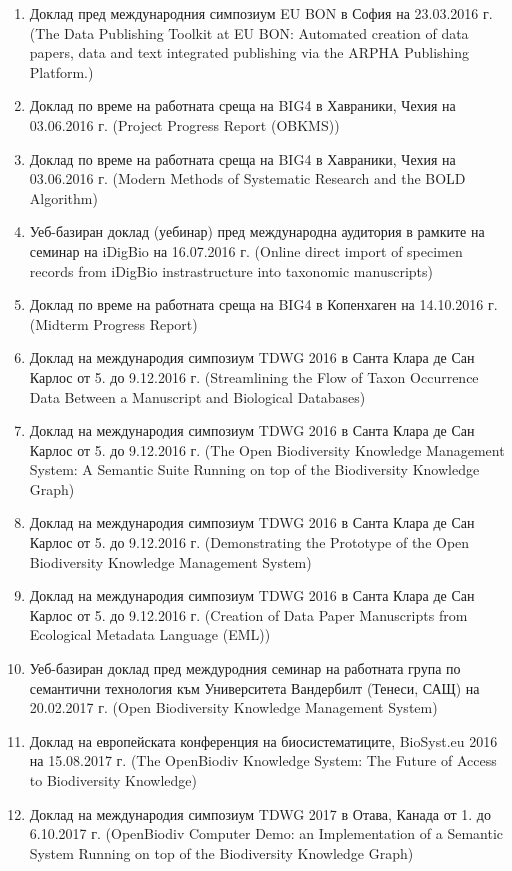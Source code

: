\begin{enumerate}
    \item Доклад пред международния симпозиум EU BON в София на 23.03.2016 г. (The Data Publishing Toolkit at EU BON: Automated creation of data papers, data and text integrated publishing via the ARPHA Publishing Platform.)
    \item Доклад по време на работната среща на BIG4 в Хавраники, Чехия на 03.06.2016 г. (Project Progress Report (OBKMS))
    \item Доклад по време на работната среща на BIG4 в Хавраники, Чехия на 03.06.2016 г. (Modern Methods of Systematic Research and the BOLD Algorithm)
    \item Уеб-базиран доклад (уебинар) пред международна аудитория в рамките на семинар на iDigBio на 16.07.2016 г. (Online direct import of specimen records from iDigBio instrastructure into taxonomic manuscripts)
    \item Доклад по време на работната среща на BIG4 в Копенхаген на 14.10.2016 г. (Midterm Progress Report)
    \item Доклад на международия симпозиум TDWG 2016 в Санта Клара де Сан Карлос от 5. до 9.12.2016 г. (Streamlining the Flow of Taxon Occurrence Data Between a Manuscript and Biological Databases)
    \item Доклад на международия симпозиум TDWG 2016 в Санта Клара де Сан Карлос от 5. до 9.12.2016 г. (The Open Biodiversity Knowledge Management System: A Semantic Suite Running on top of the Biodiversity Knowledge Graph)
    \item Доклад на международия симпозиум TDWG 2016 в Санта Клара де Сан Карлос от 5. до 9.12.2016 г. (Demonstrating the Prototype of the Open Biodiversity Knowledge Management System)
    \item Доклад на международия симпозиум TDWG 2016 в Санта Клара де Сан Карлос от 5. до 9.12.2016 г. (Creation of Data Paper Manuscripts from Ecological Metadata Language (EML))
    \item Уеб-базиран доклад пред междуродния семинар на работната група по семантични технология към Университета Вандербилт (Тенеси, САЩ) на 20.02.2017 г. (Open Biodiversity Knowledge Management System)
    \item Доклад на европейската конференция на биосистематиците, BioSyst.eu 2016 на 15.08.2017 г. (The OpenBiodiv Knowledge System: The Future of Access to Biodiversity Knowledge)
    \item Доклад на международия симпозиум TDWG 2017 в Отава, Канада от 1. до 6.10.2017 г. (OpenBiodiv Computer Demo: an Implementation of a Semantic System Running on top of the Biodiversity Knowledge Graph)

\end{enumerate}
